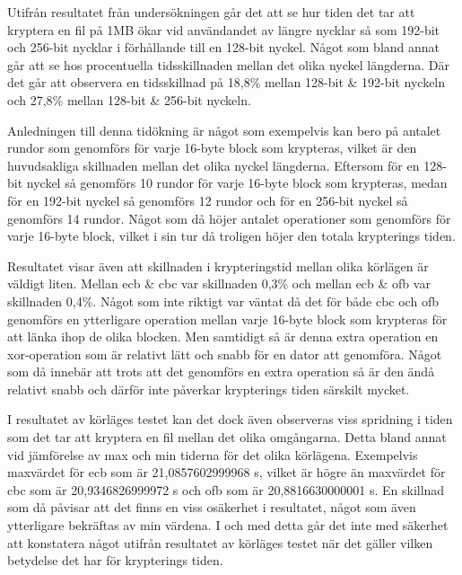 \label{chap:discussion}

Utifrån resultatet från undersökningen går det att se hur tiden det tar att kryptera en fil på 1MB ökar vid användandet av längre nycklar så som 192-\gls{bit} och 256-\gls{bit} nycklar
i förhållande till en 128-\gls{bit} nyckel. Något som bland annat går att se hos procentuella tidsskillnaden mellan det olika nyckel längderna. Där det går att observera en
tidsskillnad på 18,8\% mellan 128-\gls{bit} \& 192-\gls{bit} nyckeln och 27,8\% mellan 128-\gls{bit} \& 256-\gls{bit} nyckeln.

Anledningen till denna tidökning är något som exempelvis kan bero på antalet rundor som genomförs för varje 16-\gls{byte} block som krypteras, vilket är den huvudsakliga
skillnaden mellan det olika nyckel längderna. Eftersom för en 128-\gls{bit} nyckel så genomförs 10 rundor för varje 16-\gls{byte} block som krypteras, medan för en 192-\gls{bit}
nyckel så genomförs 12 rundor och för en 256-\gls{bit} nyckel så genomförs 14 rundor. Något som då höjer antalet operationer som genomförs för varje 16-\gls{byte} block, vilket
i sin tur då troligen höjer den totala krypterings tiden.

Resultatet visar även att skillnaden i krypteringstid mellan olika körlägen är väldigt liten. Mellan \acrshort{ecb} \& \acrshort{cbc} var skillnaden 0,3\% och mellan \acrshort{ecb}
\& \acrshort{ofb} var skillnaden 0,4\%. Något som inte riktigt var väntat då det för både \acrshort{cbc} och \acrshort{ofb}
genomförs en ytterligare operation mellan varje 16-\gls{byte} block som krypteras för att länka ihop de olika blocken. Men samtidigt så är denna extra operation en \gls{xor}-operation
som är relativt lätt och snabb för en dator att genomföra. Något som då innebär att trots att det genomförs en extra operation så är den ändå relativt snabb och därför inte
påverkar krypterings tiden särskilt mycket.

I resultatet av körläges testet kan det dock även observeras viss spridning i tiden som det tar att kryptera en fil mellan det olika omgångarna. Detta bland annat vid jämförelse av
max och min tiderna för det olika körlägena. Exempelvis maxvärdet för \acrshort{ecb} som är 21,0857602999968 s, vilket är högre än
maxvärdet för \acrshort{cbc} som är 20,9346826999972 s och \acrshort{ofb} som är 20,8816630000001 s. En skillnad som då påvisar att det finns en viss osäkerhet i
resultatet, något som även ytterligare bekräftas av min värdena. I och med detta går det inte med säkerhet att konstatera något utifrån resultatet av körläges testet
när det gäller vilken betydelse det har för krypterings tiden.

